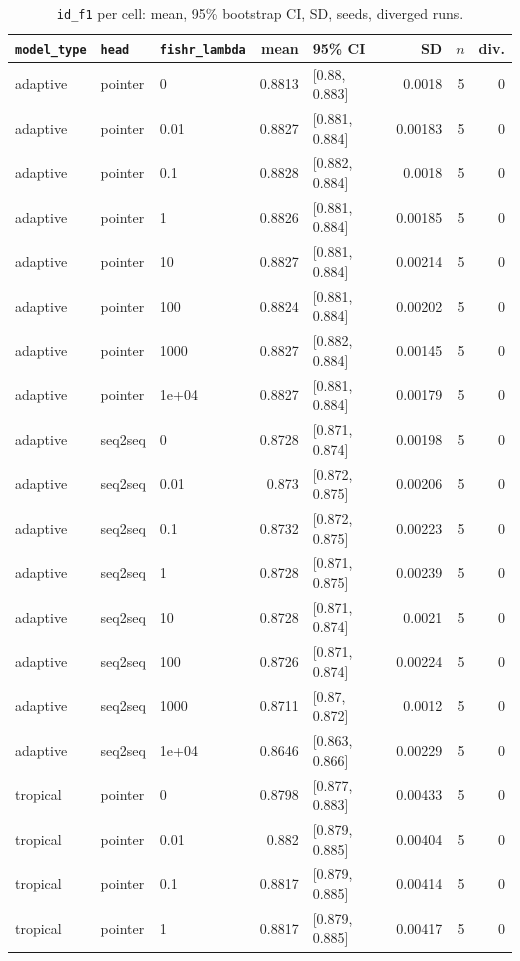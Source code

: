 \documentclass[10pt]{article}
\begin{document}
{\small
\begin{longtable}{lllrlrrr}
\caption{\texttt{id\_f1} per cell: mean, 95\% bootstrap CI, SD, seeds, diverged runs.}\label{tab:summary-id_f1}\\
\toprule
\texttt{model\_type} & \texttt{head} & \texttt{fishr\_lambda} & mean & 95\% CI & SD & $n$ & div.\\
\midrule
\endhead
adaptive & pointer & 0 & 0.8813 & [0.88, 0.883] & 0.0018 & 5 & 0\\
adaptive & pointer & 0.01 & 0.8827 & [0.881, 0.884] & 0.00183 & 5 & 0\\
adaptive & pointer & 0.1 & 0.8828 & [0.882, 0.884] & 0.0018 & 5 & 0\\
adaptive & pointer & 1 & 0.8826 & [0.881, 0.884] & 0.00185 & 5 & 0\\
adaptive & pointer & 10 & 0.8827 & [0.881, 0.884] & 0.00214 & 5 & 0\\
adaptive & pointer & 100 & 0.8824 & [0.881, 0.884] & 0.00202 & 5 & 0\\
adaptive & pointer & 1000 & 0.8827 & [0.882, 0.884] & 0.00145 & 5 & 0\\
adaptive & pointer & 1e+04 & 0.8827 & [0.881, 0.884] & 0.00179 & 5 & 0\\
adaptive & seq2seq & 0 & 0.8728 & [0.871, 0.874] & 0.00198 & 5 & 0\\
adaptive & seq2seq & 0.01 & 0.873 & [0.872, 0.875] & 0.00206 & 5 & 0\\
adaptive & seq2seq & 0.1 & 0.8732 & [0.872, 0.875] & 0.00223 & 5 & 0\\
adaptive & seq2seq & 1 & 0.8728 & [0.871, 0.875] & 0.00239 & 5 & 0\\
adaptive & seq2seq & 10 & 0.8728 & [0.871, 0.874] & 0.0021 & 5 & 0\\
adaptive & seq2seq & 100 & 0.8726 & [0.871, 0.874] & 0.00224 & 5 & 0\\
adaptive & seq2seq & 1000 & 0.8711 & [0.87, 0.872] & 0.0012 & 5 & 0\\
adaptive & seq2seq & 1e+04 & 0.8646 & [0.863, 0.866] & 0.00229 & 5 & 0\\
tropical & pointer & 0 & 0.8798 & [0.877, 0.883] & 0.00433 & 5 & 0\\
tropical & pointer & 0.01 & 0.882 & [0.879, 0.885] & 0.00404 & 5 & 0\\
tropical & pointer & 0.1 & 0.8817 & [0.879, 0.885] & 0.00414 & 5 & 0\\
tropical & pointer & 1 & 0.8817 & [0.879, 0.885] & 0.00417 & 5 & 0\\

\end{longtable}}
\end{document}
